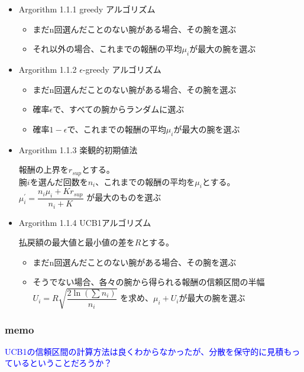 \documentclass[]{jarticle}
\begin{document}
\begin{itemize}
	\item Argorithm 1.1.1 greedy アルゴリズム

\begin{itemize}
\item まだn回選んだことのない腕がある場合、その腕を選ぶ
\item それ以外の場合、これまでの報酬の平均$\mu_i$が最大の腕を選ぶ 
\end{itemize}
	
	\item Argorithm 1.1.2 $\epsilon$-greedy アルゴリズム

\begin{itemize}
    \item まだn回選んだことのない腕がある場合、その腕を選ぶ
	\item 確率$\epsilon$で、すべての腕からランダムに選ぶ 
	\item 確率$1-\epsilon$で、これまでの報酬の平均$\mu_i$が最大の腕を選ぶ
\end{itemize}

\item Argorithm 1.1.3 楽観的初期値法

報酬の上界を$r_{sup}$とする。 \\
腕$i$を選んだ回数を$n_{i}$、これまでの報酬の平均を$\mu_i$とする。 \\
$\mu^{'}_{i} = \dfrac{n_{i}\mu_i + Kr_{sup}}{n_{i}+K}$  が最大のものを選ぶ

\item Argorithm 1.1.4 UCB1アルゴリズム

払戻額の最大値と最小値の差を$R$とする。
\begin{itemize}
	\item まだn回選んだことのない腕がある場合、その腕を選ぶ　
	\item そうでない場合、各々の腕から得られる報酬の信頼区間の半幅　\\ $U_i = R\sqrt{\dfrac{2\ln(\sum n_i)}{n_i}}$ を求め、$\mu_i+U_i$が最大の腕を選ぶ
\end{itemize}
	
\end{itemize}

\subsubsection*{memo}
\textcolor{blue}{UCB1の信頼区間の計算方法は良くわからなかったが、分散を保守的に見積もっているということだろうか？}
\end{document}
